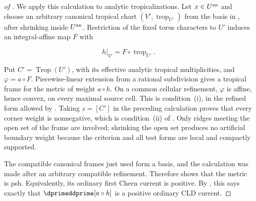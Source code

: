 \begin{proof}[of
]
We apply this calculation to analytic tropicalizations.  Let \(x\in U^{\mathrm{an}}\)
and choose an arbitrary canonical tropical chart
\((V',\operatorname{trop}_{U'})\) from the basis in
\cite[\S2.1]{GK19}, after shrinking inside \(U^{\mathrm{an}}\).  Restriction of the
fixed torus characters to \(U'\) induces an integral-affine map \(F\) with

\begin{equation}
 h|_{V'}=F\circ\operatorname{trop}_{U'}.
 \label{eq:p053-repaired-compatible-frame}
\end{equation}

Put \(C'=\operatorname{Trop}(U')\), with its effective analytic tropical
multiplicities, and \(\varphi=a\circ F\).  Piecewise-linear extension from a
rational subdivision gives a tropical frame for the metric of weight
\(a\circ h\).  On a common cellular refinement, \(\varphi\) is affine, hence
convex, on every maximal source cell.  This is condition~(i), in the
refined form allowed by \cite[Remark~8.5(a)]{GK19}.  Taking
\(z=[C']\) in the preceding calculation proves that every corner weight is
nonnegative, which is condition~(ii) of \cite[Theorem~8.4]{GK19}.  Only
ridges meeting the open set of the frame are involved; shrinking the open
set produces no artificial boundary weight because the criterion and all
test forms are local and compactly supported.

The compatible canonical frames just used form a basis, and the calculation
was made after an arbitrary compatible refinement.  Therefore
\cite[Theorem~8.4 and Remark~8.5(a)]{GK19} shows that the metric is psh.
Equivalently, its ordinary first Chern current is positive.  By
\cite[Definition~3.1]{GK19}, this says exactly that
\(\dprimeddprime[a\circ h]\) is a positive ordinary CLD current.


\end{proof}
